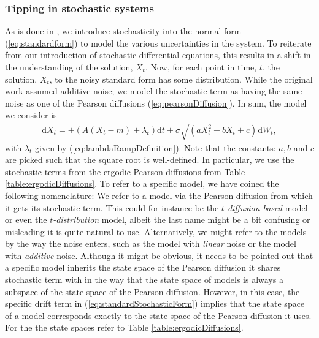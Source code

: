 \subsubsection{Tipping in stochastic systems}
As is done in \cite[equation (1)]{Ditlevsen2023}, we introduce stochasticity into the normal form (\ref{eq:standardform}) to model the various uncertainties in the system. To reiterate from our introduction of stochastic differential equations, this results in a shift in the understanding of the solution, $X_t$. Now, for each point in time, $t$, the solution, $X_t$, to the noisy standard form has some distribution. While the original work assumed additive noise; we model the stochastic term as having the same noise as one of the Pearson diffusions (\ref{eq:pearsonDiffusion}). In sum, the model we consider is
\begin{align}
    \mathrm{d}X_t = \pm\left(A\left(X_t - m\right) + \lambda_t\right)\mathrm{d}t + \sigma\sqrt{\left(aX_t^2 + bX_t + c\right)}\mathrm{d}W_t, \label{eq:standardStochasticForm}
\end{align}
with $\lambda_t$ given by (\ref{eq:lambdaRampDefinition}). Note that the constants: $a, b$ and $c$ are picked such that the square root is well-defined. In particular, we use the stochastic terms from the ergodic Pearson diffusions from Table \ref{table:ergodicDiffusions}. To refer to a specific model, we have coined the following nomenclature: We refer to a model via the Pearson diffusion from which it gets its stochastic term. This could for instance be the \textit{$t$-diffusion based} model or even the \textit{$t$-distribution} model, albeit the last name might be a bit confusing or misleading it is quite natural to use. Alternatively, we might refer to the models by the way the noise enters, such as the model with \textit{linear} noise or the model with \textit{additive} noise. Although it might be obvious, it needs to be pointed out that a specific model inherits the state space of the Pearson diffusion it shares stochastic term with in the way that the state space of models is always a subspace of the state space of the Pearson diffusion. However, in this case, the specific drift term in (\ref{eq:standardStochasticForm}) implies that the state space of a model corresponds exactly to the state space of the Pearson diffusion it uses. For the the state spaces refer to Table \ref{table:ergodicDiffusions}.\\\\
